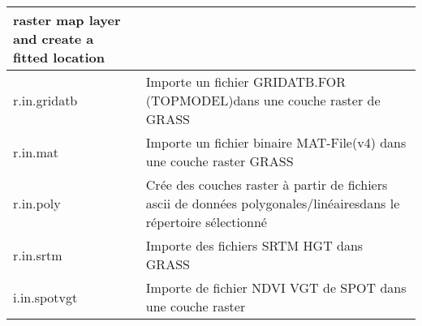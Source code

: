 \begin{center}
\begin{tabular}{|p{2.5cm}|p{11.5cm}|}
  raster map layer and create a fitted location \\
  \hline r.in.gridatb & Importe un fichier GRIDATB.FOR (TOPMODEL)dans une couche raster de GRASS\\
  \hline r.in.mat  & Importe un fichier binaire MAT-File(v4) dans une couche  raster GRASS \\
  \hline r.in.poly  & Crée des couches raster à partir de fichiers ascii de données polygonales/linéairesdans le répertoire sélectionné \\
  \hline r.in.srtm  & Importe des fichiers SRTM HGT dans GRASS \\
  \hline i.in.spotvgt & Importe de fichier NDVI VGT de SPOT dans une couche raster \\
  \hline
\end{tabular}
\end{center}

